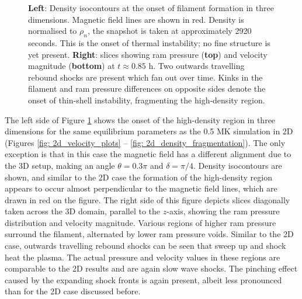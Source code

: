 \begin{figure}[t]
\begin{minipage}{0.54\textwidth}
  \end{minipage}
  \caption{
    \textbf{Left}: Density isocontours at the onset of filament formation in three dimensions. Magnetic field lines are shown in red. Density is normalised to $\rho_n$, the snapshot is taken at approximately 2920 seconds. This is the onset of thermal instability; no fine structure is yet present. \textbf{Right}: slices showing ram pressure (\textbf{top}) and velocity magnitude (\textbf{bottom}) at $t \approx 0.85$ h. Two outwards travelling rebound shocks are present which fan out over time. Kinks in the filament and ram pressure differences on opposite sides denote the onset of thin-shell instability, fragmenting the high-density region.}
  \label{fig: 3d_onset_pressure_velocity}
\end{figure}

The left side of Figure \ref{fig: 3d_onset_pressure_velocity} shows the onset of the high-density region in three dimensions for the same equilibrium parameters as the 0.5 MK simulation in 2D (Figures \ref{fig: 2d_velocity_plots} -- \ref{fig: 2d_density_fragmentation}). The only exception is that in this case the magnetic field has a different alignment due to the 3D setup, making an angle $\theta = 0.3\pi$ and $\delta=\pi/4$. Density isocontours are shown, and similar to the 2D case the formation of the high-density region appears to occur almost perpendicular to the magnetic field lines, which are drawn in red on the figure. The right side of this figure depicts slices diagonally taken across the 3D domain, parallel to the $z$-axis, showing the ram pressure distribution and velocity magnitude. Various regions of higher ram pressure surround the filament, alternated by lower ram pressure voids. Similar to the 2D case, outwards travelling rebound shocks can be seen that sweep up and shock heat the plasma. The actual pressure and velocity values in these regions are comparable to the 2D results and are again slow wave shocks. The pinching effect caused by the expanding shock fronts is again present, albeit less pronounced than for the 2D case discussed before.

